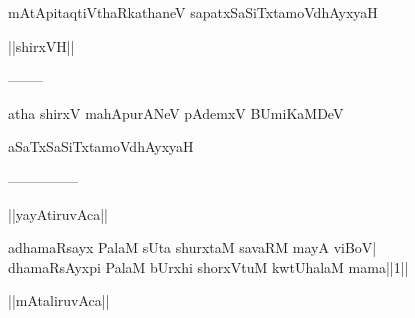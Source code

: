 \documentclass{article}
\begin{document}
\begin{center}
mAtApitaqtiVthaRkathaneV sapatxSaSiTxtamoVdhAyxyaH
\end{center}

\begin{center}
||shirxVH||
\end{center}

\begin{center}
--------
\end{center}

\begin{center}
atha shirxV mahApurANeV pAdemxV BUmiKaMDeV
\end{center}

\begin{center}
aSaTxSaSiTxtamoVdhAyxyaH
\end{center}

\begin{center}

---------------
\end{center}

\begin{center}
||yayAtiruvAca||
\end{center}

adhamaRsayx PalaM sUta shurxtaM savaRM mayA viBoV|\\
dhamaRsAyxpi PalaM bUrxhi shorxVtuM kwtUhalaM mama||1||\\

\begin{center}
||mAtaliruvAca||
\end{center}
\end{document}
